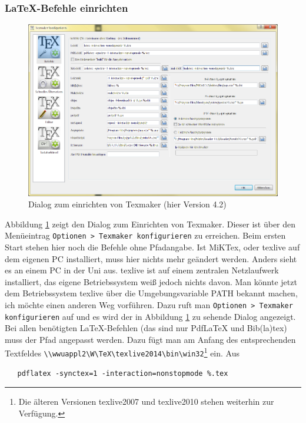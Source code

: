 \subsubsection{\LaTeX-Befehle einrichten}\label{sec:texmaker_conf}

\begin{figure}[bh]
\includegraphics[width=\textwidth]{Bilder/Texmaker_konfigurieren.png}
\caption{Dialog zum einrichten von Texmaker (hier Version 4.2)}
\label{img:texmaker_conf}
\end{figure}

Abbildung \ref{img:texmaker_conf} zeigt den Dialog zum Einrichten von Texmaker. Dieser ist über den Menüeintrag \verb+Optionen > Texmaker konfigurieren+ zu erreichen. Beim ersten Start stehen hier noch die Befehle ohne Pfadangabe. Ist MiKTex, oder texlive auf dem eigenen PC installiert, muss hier nichts mehr geändert werden. Anders sieht es an einem PC in der Uni aus. texlive ist auf einem zentralen Netzlaufwerk installiert, das eigene Betriebssystem weiß jedoch nichts davon. Man könnte jetzt dem Betriebssystem texlive über die Umgebungsvariable PATH bekannt machen, ich möchte einen anderen Weg vorführen. Dazu ruft man \verb+Optionen > Texmaker konfigurieren+ auf und es wird der in Abbildung \ref{img:texmaker_conf} zu sehende Dialog angezeigt. Bei allen benötigten \LaTeX-Befehlen (das sind nur PdfLaTeX und Bib(la)tex) muss der Pfad angepasst werden. Dazu fügt man am Anfang des entsprechenden Textfeldes \verb+\\wwuappl2\W\TeX\texlive2014\bin\win32+\footnote{Die älteren Versionen texlive2007 und texlive2010 stehen weiterhin zur Verfügung.} ein. Aus

\begin{verbatim}
   pdflatex -synctex=1 -interaction=nonstopmode %.tex
\end{verbatim}

